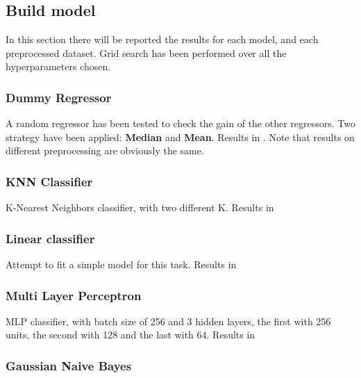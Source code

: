 \subsection{Build model}

In this section there will be reported the results for each model, and each preprocessed dataset.
Grid search has been performed over all the hyperparameters chosen.


\subsubsection{Dummy Regressor}

A random regressor has been tested to check the gain of the other regressors. Two strategy have been applied: \textbf{Median} and \textbf{Mean}. Results in .
Note that results on different preprocessing are obviously the same.



\subsubsection{KNN Classifier}

K-Nearest Neighbors classifier, with two different K. Results in 



\subsubsection{Linear classifier}

Attempt to fit a simple model for this task. Results in 




\subsubsection{Multi Layer Perceptron}

MLP classifier, with batch size of 256 and 3 hidden layers, the first with 256 units, the second with 128 and the last with 64. Results in 



\subsubsection{Gaussian Naive Bayes}

